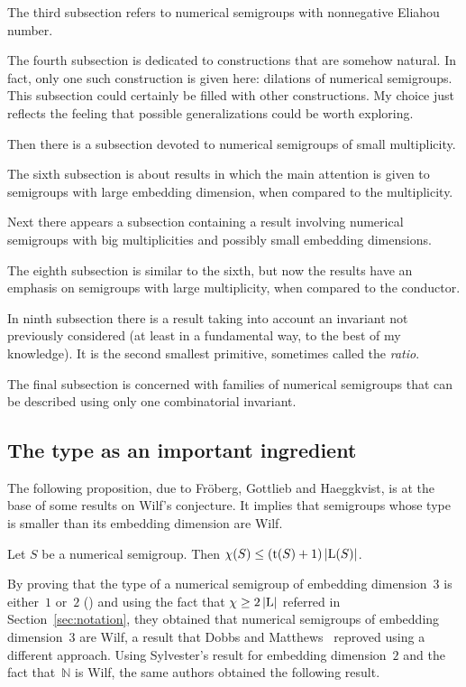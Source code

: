 The third subsection refers to numerical semigroups with nonnegative Eliahou number.
 
The fourth subsection is dedicated to constructions that are somehow natural. In fact, only one such construction is given here: dilations of numerical semigroups. This subsection could certainly be filled with other constructions. My choice just reflects the feeling that possible generalizations could be worth exploring.

Then there is a subsection devoted to numerical semigroups of small multiplicity.

The sixth subsection is about results in which the main attention is given to semigroups with large embedding dimension, when compared to the multiplicity.

Next there appears a subsection containing a result involving numerical semigroups with big multiplicities and possibly small embedding dimensions.
 
The eighth subsection is similar to the sixth, but now the results have an emphasis on semigroups with large multiplicity, when compared to the conductor.
 
In ninth subsection there is a result taking into account an invariant not previously considered (at least in a fundamental way, to the best of my knowledge). It is the second smallest primitive, sometimes called the \emph{ratio}.
 
The final subsection is concerned with families of numerical semigroups that can be described using only one combinatorial invariant. 

\subsection{The type as an important ingredient}

The following proposition, due to Fröberg, Gottlieb and Haeggkvist, is at the base of some results on Wilf's conjecture. It implies that semigroups whose type is smaller than its embedding dimension are Wilf.

\begin{proposition}\label{prop:type}
    Let $S$ be a numerical semigroup. Then $\operatorname{\chi}(S)\le(\operatorname{t}(S)+1)\left|\operatorname{L}(S)\right|$.
\end{proposition}

By proving that the type of a numerical semigroup of embedding dimension~$3$ is either~$1$ or~$2$ (\cite[Th.~11]{FroebergGottliebHaeggkvist1987SF-numerical}) and using the fact that $\operatorname{\chi}\ge 2\left|\operatorname{L}\right|$ referred in Section~\ref{sec:notation}, they obtained that numerical semigroups of embedding dimension~$3$ are Wilf, a result that Dobbs and Matthews~\cite[Cor.~2.6]{DobbsMatthews2006} reproved using a different approach.
%
Using Sylvester's result for embedding dimension~$2$ and the fact that~$\mathbb{N}$ is Wilf, the same authors obtained the following result.

